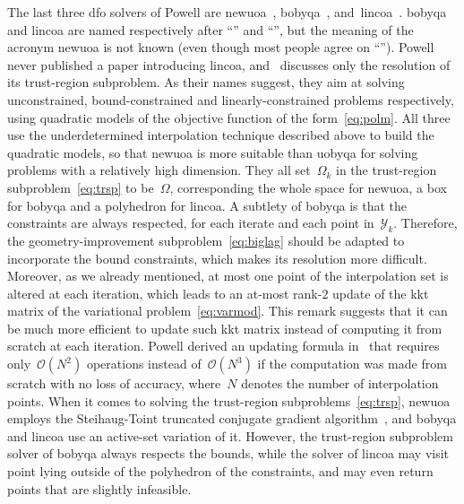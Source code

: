 \documentclass[11pt,draft]{article}
\numberwithin{equation}{section}
\newcommand\srchspmdl[1][k]{\Omega_{#1}}
\newcommand\itpls[1][k]{\mathcal{Y}_{#1}}
\begin{document}
The last three \gls{dfo} solvers of Powell are \gls{newuoa}~\cite{Powell_2006, Powell_2008}, \gls{bobyqa}~\cite{Powell_2009}, and~\gls{lincoa}~\cite{Powell_2015}.
\Gls{bobyqa} and \gls{lincoa} are named respectively after \enquote{} and \enquote{}, but the meaning of the acronym \gls{newuoa} is not known (even though most people agree on \enquote{}).
Powell never published a paper introducing \gls{lincoa}, and~\cite{Powell_2015} discusses only the resolution of its trust-region subproblem.
As their names suggest, they aim at solving unconstrained, bound-constrained and linearly-constrained problems respectively, using quadratic models of the objective function of the form~\eqref{eq:polm}.
All three use the underdetermined interpolation technique described above to build the quadratic models, so that \gls{newuoa} is more suitable than \gls{uobyqa} for solving problems with a relatively high dimension.
They all set~$\srchspmdl$ in the trust-region subproblem~\eqref{eq:trsp} to be~$\Omega$, corresponding the whole space for \gls{newuoa}, a box for \gls{bobyqa} and a polyhedron for \gls{lincoa}.
A subtlety of \gls{bobyqa} is that the constraints are always respected, for each iterate and each point in~$\itpls$.
Therefore, the geometry-improvement subproblem~\eqref{eq:biglag} should be adapted to incorporate the bound constraints, which makes its resolution more difficult.
Moreover, as we already mentioned, at most one point of the interpolation set is altered at each iteration, which leads to an at-most rank-$2$ update of the \gls{kkt} matrix of the variational problem~\eqref{eq:varmod}.
This remark suggests that it can be much more efficient to update such \gls{kkt} matrix instead of computing it from scratch at each iteration.
Powell derived an updating formula in~\cite{Powell_2004b} that requires only~$\mathcal{O}(N^2)$ operations instead of~$\mathcal{O}(N^3)$ if the computation was made from scratch with no loss of accuracy, where~$N$ denotes the number of interpolation points.
When it comes to solving the trust-region subproblems~\eqref{eq:trsp}, \gls{newuoa} employs the Steihaug-Toint truncated conjugate gradient algorithm~\cite{Steihaug_1983, Toint_1981}, and \gls{bobyqa} and \gls{lincoa} use an active-set variation of it.
However, the trust-region subproblem solver of \gls{bobyqa} always respects the bounds, while the solver of \gls{lincoa} may visit point lying outside of the polyhedron of the constraints, and may even return points that are slightly infeasible.
\end{document}
